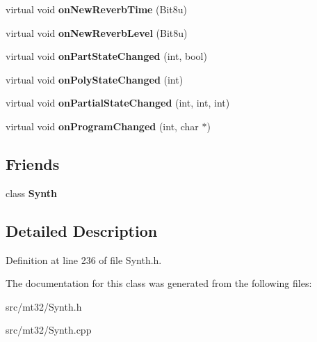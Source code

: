 \begin{DoxyCompactItemize}
\item 
\hypertarget{classMT32Emu_1_1ReportHandler_a3b6b99ff146e37bb6b6436fff81bfe59}{virtual void {\bfseries on\-New\-Reverb\-Time} (Bit8u)}\label{classMT32Emu_1_1ReportHandler_a3b6b99ff146e37bb6b6436fff81bfe59}

\item 
\hypertarget{classMT32Emu_1_1ReportHandler_aeb675c75dd450735331fca72eed32cfc}{virtual void {\bfseries on\-New\-Reverb\-Level} (Bit8u)}\label{classMT32Emu_1_1ReportHandler_aeb675c75dd450735331fca72eed32cfc}

\item 
\hypertarget{classMT32Emu_1_1ReportHandler_a99183fb5d4f5137e9ae8e27bf56791a9}{virtual void {\bfseries on\-Part\-State\-Changed} (int, bool)}\label{classMT32Emu_1_1ReportHandler_a99183fb5d4f5137e9ae8e27bf56791a9}

\item 
\hypertarget{classMT32Emu_1_1ReportHandler_a8cb0a7e7b3e2e0c9c72227fcf9b08fd9}{virtual void {\bfseries on\-Poly\-State\-Changed} (int)}\label{classMT32Emu_1_1ReportHandler_a8cb0a7e7b3e2e0c9c72227fcf9b08fd9}

\item 
\hypertarget{classMT32Emu_1_1ReportHandler_a81da978e4545b951309586a71bad4a60}{virtual void {\bfseries on\-Partial\-State\-Changed} (int, int, int)}\label{classMT32Emu_1_1ReportHandler_a81da978e4545b951309586a71bad4a60}

\item 
\hypertarget{classMT32Emu_1_1ReportHandler_a956ab5f36a4c5c578369fc8b170f1976}{virtual void {\bfseries on\-Program\-Changed} (int, char $\ast$)}\label{classMT32Emu_1_1ReportHandler_a956ab5f36a4c5c578369fc8b170f1976}

\end{DoxyCompactItemize}
\subsection*{Friends}
\begin{DoxyCompactItemize}
\item 
\hypertarget{classMT32Emu_1_1ReportHandler_a2876499cfb5ad14c8db5307316656627}{class {\bfseries Synth}}\label{classMT32Emu_1_1ReportHandler_a2876499cfb5ad14c8db5307316656627}

\end{DoxyCompactItemize}


\subsection{Detailed Description}


Definition at line 236 of file Synth.\-h.



The documentation for this class was generated from the following files\-:\begin{DoxyCompactItemize}
\item 
src/mt32/Synth.\-h\item 
src/mt32/Synth.\-cpp\end{DoxyCompactItemize}

